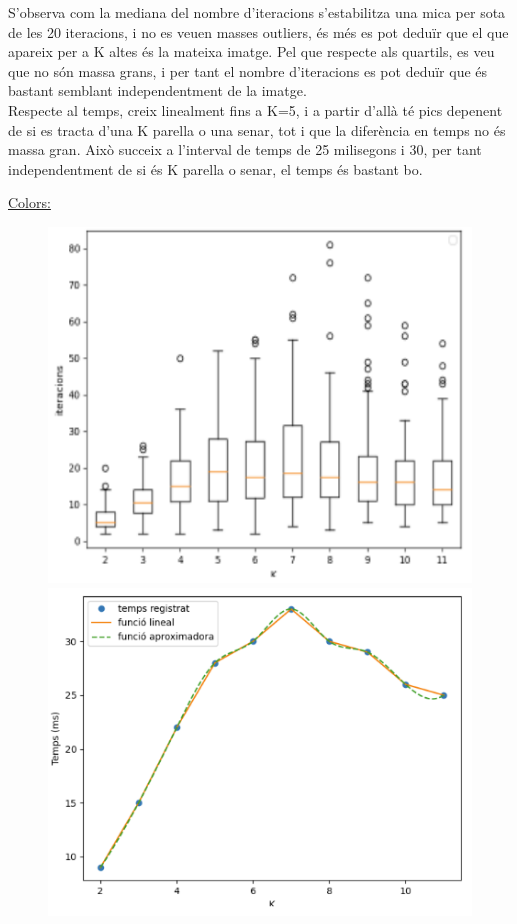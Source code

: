 \documentclass[a4paper, 11pt]{article}
\begin{document}
\justify
S'observa com la mediana del nombre d'iteracions s'estabilitza una mica per sota de les 20 iteracions, i no es veuen masses outliers, és més es pot deduïr que el que apareix per a K altes és la mateixa imatge. Pel que respecte als quartils, es veu que no són massa grans, i per tant el nombre d'iteracions es pot deduïr que és bastant semblant independentment de la imatge.\\
Respecte al temps, creix linealment fins a K=5, i a partir d'allà té pics depenent de si es tracta d'una K parella o una senar, tot i que la diferència en temps no és massa gran. Això succeix a l'interval de temps de 25 milisegons i 30, per tant independentment de si és K parella o senar, el temps és bastant bo. 


\center\underline{Colors:}
\begin{figure}[h!]
\centering
\begin{minipage}{.5\textwidth}
  \centering
  \includegraphics[width=.8\linewidth]{boxplot_colors_centroides.PNG}
\end{minipage}%
\begin{minipage}{.5\textwidth}
  \centering
  \includegraphics[width=.8\linewidth]{temps_color_centroides.PNG}
\end{minipage}
\end{figure}
\end{document}
